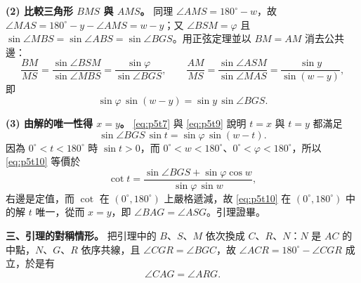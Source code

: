 \textbf{(2) 比較三角形 $BM\!S$ 與 $AM\!S$。}
同理 $\angle{AMS}=180^{\circ}-w$，故 $\angle{MAS}=180^{\circ}-y-\angle{AMS}=w-y$；又 $\angle{BSM}=\varphi$ 且 $\sin\angle{MBS}=\sin\angle{ABS}=\sin\angle{BGS}$。用正弦定理並以 $BM=AM$ 消去公共邊：
\begin{equation}\label{eq:p5t8}
  \frac{BM}{MS}=\frac{\sin\angle{BSM}}{\sin\angle{MBS}}=\frac{\sin\varphi}{\sin\angle{BGS}},
  \qquad
  \frac{AM}{MS}=\frac{\sin\angle{ASM}}{\sin\angle{MAS}}=\frac{\sin y}{\sin(w-y)},
\end{equation}
即
\begin{equation}\label{eq:p5t9}
  \sin\varphi\,\sin(w-y)=\sin y\,\sin\angle{BGS}.
\end{equation}

\textbf{(3) 由解的唯一性得 $x=y$。}
\eqref{eq:p5t7} 與 \eqref{eq:p5t9} 說明 $t=x$ 與 $t=y$ 都滿足
\begin{equation}\label{eq:p5t10}
  \sin\angle{BGS}\,\sin t=\sin\varphi\,\sin(w-t).
\end{equation}
因為 $0^{\circ}<t<180^{\circ}$ 時 $\sin t>0$，而 $0^{\circ}<w<180^{\circ}$、$0^{\circ}<\varphi<180^{\circ}$，所以 \eqref{eq:p5t10} 等價於
\begin{equation}\label{eq:p5t11}
  \cot t=\frac{\sin\angle{BGS}+\sin\varphi\cos w}{\sin\varphi\,\sin w},
\end{equation}
右邊是定值，而 $\cot$ 在 $(0^{\circ},180^{\circ})$ 上嚴格遞減，故 \eqref{eq:p5t10} 在 $(0^{\circ},180^{\circ})$ 中的解 $t$ 唯一，從而 $x=y$，即 $\angle{BAG}=\angle{ASG}$。引理證畢。

\textbf{三、引理的對稱情形。}
把引理中的 $B$、$S$、$M$ 依次換成 $C$、$R$、$N$：$N$ 是 $AC$ 的中點，$N$、$G$、$R$ 依序共線，且 $\angle{CGR}=\angle{BGC}$，故 $\angle{ACR}=180^{\circ}-\angle{CGR}$ 成立，於是有
\begin{equation}\label{eq:p5t12}
  \angle{CAG}=\angle{ARG}.
\end{equation}

